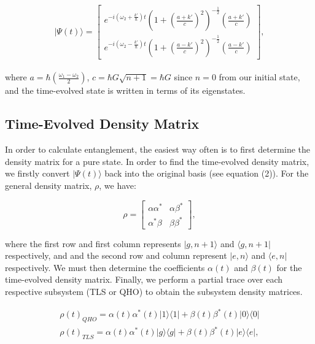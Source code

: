 \documentclass[12pt,a4paper]{article}
\begin{document}
\begin{equation}
    |\Psi(t)\rangle = \begin{bmatrix}
        e^{-i(\omega_2 + \frac{k'}{\hbar})t}(1+(\frac{a+k'}{c})^2)^{-\frac{1}{2}}(\frac{a+k'}{c}) \\
        e^{-i(\omega_2 - \frac{k'}{\hbar})t}(1+(\frac{a-k'}{c})^2)^{-\frac{1}{2}}(\frac{a-k'}{c})
    \end{bmatrix},
\end{equation}
\\
where $a = \hbar(\frac{\omega_1 - \omega_2}{2})$, $c = \hbar G\sqrt{n+1} = \hbar G$ since $n=0$ from our initial state, and the time-evolved state is written in terms of its eigenstates.
\\
\subsection{\normalsize{Time-Evolved Density Matrix}}

In order to calculate entanglement, the easiest way often is to first determine the density matrix for a pure state. In order to find the time-evolved density matrix, we firstly convert $|\Psi(t)\rangle$ back into the original basis (see equation (2)). For the general density matrix, $\rho$, we have:

\begin{equation}
    \rho = \begin{bmatrix}
        \alpha\alpha^* & \alpha\beta^* \\
        \alpha^*\beta & \beta\beta^*
    \end{bmatrix},
\end{equation}

where the first row and first column represents $|g,n+1\rangle$ and $\langle g,n+1|$ respectively, and  and the second row and column represent $|e,n\rangle$ and $\langle e,n|$ respectively. We must then determine the coefficients $\alpha(t)$ and $\beta(t)$ for the time-evolved density matrix. Finally, we perform a partial trace over each respective subsystem (TLS or QHO) to obtain the subsystem density matrices.

\begin{align}
    \rho(t)_{QHO} = \alpha(t)\alpha^*(t)|1\rangle\langle1| + \beta(t)\beta^*(t)|0\rangle\langle0|
    \\
    \rho(t)_{TLS} = \alpha(t)\alpha^*(t)|g\rangle\langle g| + \beta(t)\beta^*(t)|e\rangle\langle e|,
\end{align}
\end{document}
